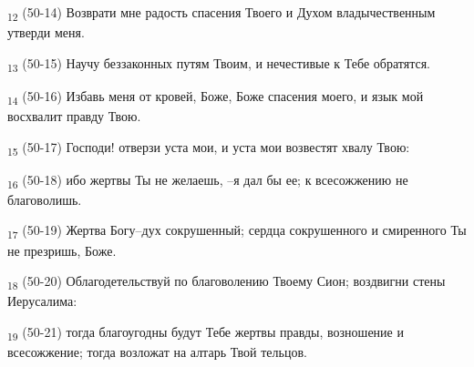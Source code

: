 \begin{tcolorbox}
\textsubscript{12} (50-14) Возврати мне радость спасения Твоего и Духом владычественным утверди меня.
\end{tcolorbox}
\begin{tcolorbox}
\textsubscript{13} (50-15) Научу беззаконных путям Твоим, и нечестивые к Тебе обратятся.
\end{tcolorbox}
\begin{tcolorbox}
\textsubscript{14} (50-16) Избавь меня от кровей, Боже, Боже спасения моего, и язык мой восхвалит правду Твою.
\end{tcolorbox}
\begin{tcolorbox}
\textsubscript{15} (50-17) Господи! отверзи уста мои, и уста мои возвестят хвалу Твою:
\end{tcolorbox}
\begin{tcolorbox}
\textsubscript{16} (50-18) ибо жертвы Ты не желаешь, --я дал бы ее; к всесожжению не благоволишь.
\end{tcolorbox}
\begin{tcolorbox}
\textsubscript{17} (50-19) Жертва Богу--дух сокрушенный; сердца сокрушенного и смиренного Ты не презришь, Боже.
\end{tcolorbox}
\begin{tcolorbox}
\textsubscript{18} (50-20) Облагодетельствуй по благоволению Твоему Сион; воздвигни стены Иерусалима:
\end{tcolorbox}
\begin{tcolorbox}
\textsubscript{19} (50-21) тогда благоугодны будут Тебе жертвы правды, возношение и всесожжение; тогда возложат на алтарь Твой тельцов.
\end{tcolorbox}

